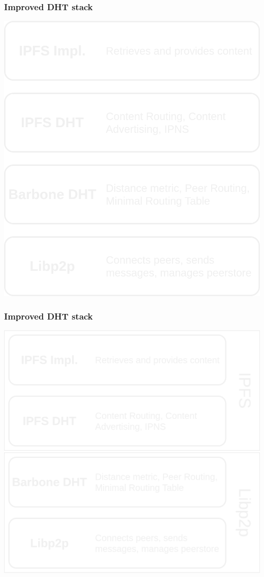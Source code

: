 \documentclass{../pl-slide}
\begin{document}
\begin{frame}
\frametitle{Improved DHT stack}
\includegraphics[scale=.18]{resources/improved-dht-stack.png}
\end{frame}
\begin{frame}
\frametitle{Improved DHT stack}
\includegraphics[scale=.18]{resources/improved-dht-stack-cat.png}
\end{frame}
\end{document}
